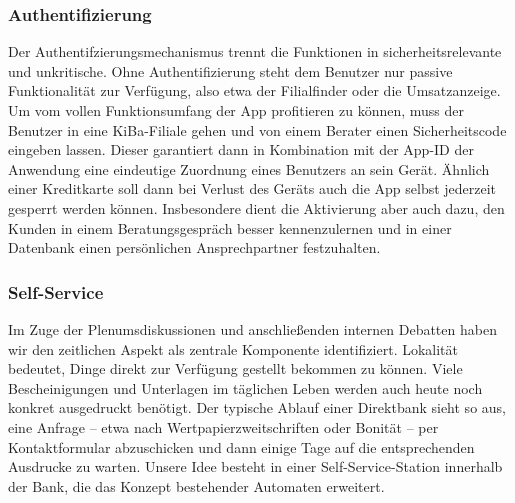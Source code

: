 \subsubsection{Authentifizierung}
	Der Authentifzierungsmechanismus trennt die Funktionen in sicherheitsrelevante und unkritische. Ohne Authentifizierung steht dem Benutzer nur passive Funktionalität zur Verfügung, also etwa der Filialfinder oder die Umsatzanzeige. Um vom vollen Funktionsumfang der App profitieren zu können, muss der Benutzer in eine KiBa-Filiale gehen und von einem Berater einen Sicherheitscode eingeben lassen. Dieser garantiert dann in Kombination mit der App-ID der Anwendung eine eindeutige Zuordnung eines Benutzers an sein Gerät. Ähnlich einer Kreditkarte soll dann bei Verlust des Geräts auch die App selbst jederzeit gesperrt werden können. Insbesondere dient die Aktivierung aber auch dazu, den Kunden in einem Beratungsgespräch besser kennenzulernen und in einer Datenbank einen persönlichen Ansprechpartner festzuhalten.
	
\subsubsection{Self-Service}
	Im Zuge der Plenumsdiskussionen und anschließenden internen Debatten haben wir den zeitlichen Aspekt als zentrale Komponente identifiziert. Lokalität bedeutet, Dinge direkt zur Verfügung gestellt bekommen zu können. Viele Bescheinigungen und Unterlagen im täglichen Leben werden auch heute noch konkret ausgedruckt benötigt. Der typische Ablauf einer Direktbank sieht so aus, eine Anfrage – etwa nach Wertpapierzweitschriften oder Bonität – per Kontaktformular abzuschicken und dann einige Tage auf die entsprechenden Ausdrucke zu warten. Unsere Idee besteht in einer Self-Service-Station innerhalb der Bank, die das Konzept bestehender Automaten erweitert.
	
